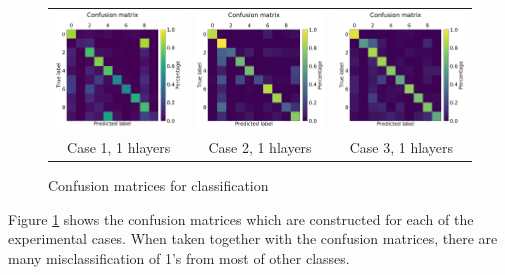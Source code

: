 \documentclass[letterpaper, 10 pt, conference]{ieeeconf}  %
\begin{document}
\begin{figure}[tbh]
    \centering
    \begin{centering}
    \begin{tabular}{ccc}
        \includegraphics[width=0.30\linewidth, trim=0cm 0cm 0cm 1.5cm, clip=true]{mnist_confusion_matrix_rate_based_case_1_rate_pynn8_1dlayers_3x_20200217}&
        \includegraphics[width=0.30\linewidth, trim=0cm 0cm 0cm 1.5cm, clip=true]{mnist_confusion_matrix_rate_based_case_2_rate_pynn8_1dlayers_3x_20200217}&
        \includegraphics[width=0.30\linewidth, trim=0cm 0cm 0cm 1.5cm, clip=true]{mnist_confusion_matrix_rate_based_case_3_rate_pynn8_1dlayers_2x_20200217}\\
        Case 1, 1 hlayers & Case 2, 1 hlayers & Case 3, 1 hlayers
        \end{tabular}
     \end{centering}
     \caption{Confusion matrices for classification}
     \label{fig:confmat}
    \vspace{-10pt}
\end{figure}

Figure \ref{fig:confmat} shows the confusion matrices which are constructed for each of the experimental cases.
When taken together with the confusion matrices, there are many misclassification of 1's from most of other classes.

\end{document}
